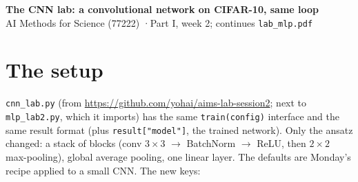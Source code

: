 \documentclass[11pt]{article}
\newcommand{\code}[1]{\texttt{#1}}
\begin{document}
\sloppy
\begin{center}
{\Large\bfseries The CNN lab: a convolutional network on CIFAR-10, same loop}\\[3pt]
AI Methods for Science (77222) \quad·\quad Part I, week 2; continues \code{lab\_mlp.pdf}
\end{center}

\section*{The setup}
\code{cnn\_lab.py} (from \url{https://github.com/yohai/aims-lab-session2}; next to \code{mlp\_lab2.py}, which it imports) has the same \code{train(config)} interface and the same result format (plus \code{result["model"]}, the trained network). Only the ansatz changed: a stack of blocks (conv $3\times3$ $\to$ BatchNorm $\to$ ReLU, then $2\times2$ max-pooling), global average pooling, one linear layer. The defaults are Monday's recipe applied to a small CNN. The new keys:
\end{document}
